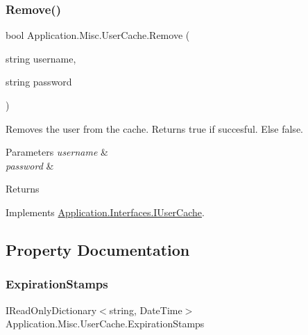 \mbox{\label{class_application_1_1_misc_1_1_user_cache_af685f56bf378e2bde07f7f6f933a8e0e}} 
\subsubsection{\texorpdfstring{Remove()}{Remove()}}
{\footnotesize\ttfamily bool Application.\+Misc.\+User\+Cache.\+Remove (\begin{DoxyParamCaption}\item[{string}]{username,  }\item[{string}]{password }\end{DoxyParamCaption})}



Removes the user from the cache. Returns true if succesful. Else false. 


\begin{DoxyParams}{Parameters}
{\em username} & \\
\hline
{\em password} & \\
\hline
\end{DoxyParams}
\begin{DoxyReturn}{Returns}

\end{DoxyReturn}


Implements \mbox{\hyperlink{interface_application_1_1_interfaces_1_1_i_user_cache_ac8ccbf20ac25069528e1e5117d5481ee}{Application.\+Interfaces.\+I\+User\+Cache}}.



\subsection{Property Documentation}
\mbox{\label{class_application_1_1_misc_1_1_user_cache_ad5b655841c5a15022a372cfe9fb6960d}} 
\subsubsection{\texorpdfstring{Expiration\+Stamps}{ExpirationStamps}}
{\footnotesize\ttfamily I\+Read\+Only\+Dictionary$<$string, Date\+Time$>$ Application.\+Misc.\+User\+Cache.\+Expiration\+Stamps\hspace{0.3cm}{\ttfamily [get]}}



